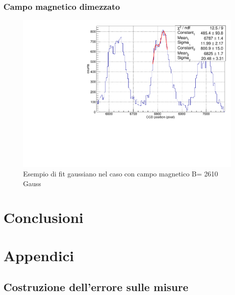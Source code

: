 \documentclass{article}
\begin{document}
	\subsubsection*{Campo magnetico dimezzato}
	
	
	\begin{center}
	\begin{figure}[H]
		\centering
		\includegraphics[scale=0.38, angle=0]{campomin/singolo.pdf}
		\caption{ Esempio di fit gaussiano nel caso con campo magnetico B= 2610 Gauss}
		\label{fig:singoloBonMin}
	\end{figure}
\end{center}

	\section*{Conclusioni}



	\newpage
	\appendix
	\section{Appendici}
	\label{appendice}
	\subsection{Costruzione dell'errore sulle misure}
	\label{Calcerr}
\end{document}
